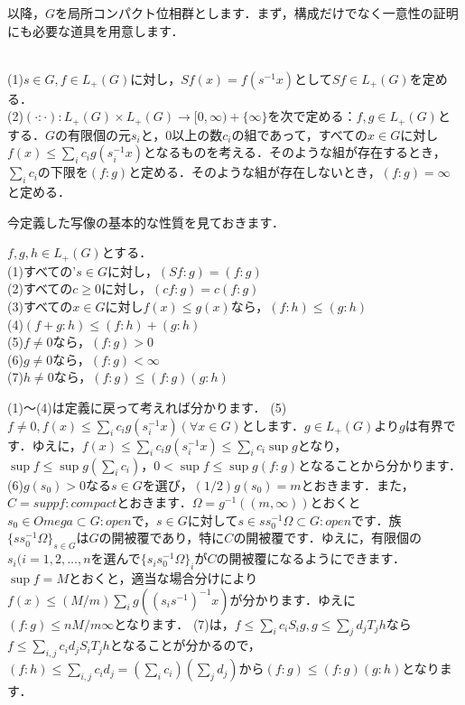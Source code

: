 以降，$G$を局所コンパクト位相群とします．まず，構成だけでなく一意性の証明にも必要な道具を用意します．

\begin{defi}\label{17}
\leavevmode \\
(1)$s \in G, f \in L_{+}(G)$に対し，$Sf(x)=f(s^{-1}x)$として$Sf \in L_{+}(G)$を定める．\\
(2)$(\cdot \colon \cdot ) \colon L_{+}(G) \times L_{+}(G) \to [0, \infty)+\{ \infty \}$を次で定める：$f, g \in L_{+}(G)$とする．$G$の有限個の元$s_i$と，0以上の数$c_i$の組であって，すべての$x \in G$に対し$f(x) \le \sum_{i}c_{i} g(s_{i}^{-1}x)$となるものを考える．そのような組が存在するとき，$\sum_{i}c_i$の下限を$(f \colon g)$と定める．そのような組が存在しないとき，$(f \colon g)=\infty$と定める．
\end{defi}
今定義した写像の基本的な性質を見ておきます．
\begin{prop}\label{18}
$f, g, h \in L_{+}(G)$とする．\\
(1)すべての'$s \in G$に対し，$(Sf \colon g)=(f \colon g)$\\
(2)すべての$c \ge 0$に対し，$(cf \colon g)=c(f \colon g)$\\
(3)すべての$x \in G$に対し$f(x) \le g(x)$なら，$(f \colon h) \le (g \colon h)$\\
(4)$(f+g \colon h) \le (f \colon h)+(g \colon h)$\\
(5)$f \ne 0$なら，$( f \colon g ) > 0$\\
(6)$g \ne 0$なら，$( f \colon g ) < \infty $\\
(7)$h \ne 0$なら，$( f \colon g ) \le (f \colon g ) (g \colon h )$\\
\end{prop}
\begin{Proof}
(1)〜(4)は定義に戻って考えれば分かります．
(5)$f \ne 0, f(x) \le \sum_{i}c_{i} g(s_{i}^{-1}x) (\forall x \in G)$とします．$g \in L_{+}(G)$より$g$は有界です．ゆえに，$f(x) \le \sum_{i}c_{i} g(s_{i}^{-1}x) \le \sum_{i}c_{i} \sup g$となり，$\sup f \le \sup g ( \sum_{i}c_{i} )$，$0<\sup f \le \sup g (f \colon g )$となることから分かります．
(6)$g(s_{0}) > 0$なる$s \in G$を選び，$(1/2)g(s_{0})=m$とおきます．また，$C=supp f \colon compact$とおきます．$\Omega = g^{-1}( (m, \infty) )$とおくと$s_{0} \in Omega \subset G \colon open$で，$s \in G$に対して$s \in s s_{0}^{-1} \Omega \subset G \colon open$です．族$\{ s s_{0}^{-1}\Omega \}_{s \in G}$は$G$の開被覆であり，特に$C$の開被覆です．ゆえに，有限個の$ s_i(i=1,2, \ldots , n$を選んで$\{ s_{i} s_{0}^{-1}\Omega \}_{i}$が$C$の開被覆になるようにできます．$\sup f=M$とおくと，適当な場合分けにより$f(x) \le (M/m)\sum_{i} g( (s_{i} s^{-1}) ^{-1}x)$が分かります．ゆえに$(f \colon g ) \le nM/m \infty $となります．
(7)は，$f \le \sum_{i} c_{i}S_{i}g, g \le \sum_{j} d_{j}T_{j}h$なら$f \le \sum_{i,j} c_{i}d_{j}S_iT_{j}h$となることが分かるので，$(f \colon h ) \le \sum_{i,j} c_{i}d_{j} = ( \sum_{i} c_{i} ) (\sum_{j} d_{j} )$から$( f \colon g ) \le (f \colon g ) (g \colon h )$となります．　
\end{Proof}

